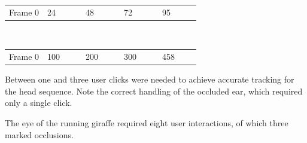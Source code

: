 \documentclass[landscape,final,fontscale=0.225,paperwidth=67.5in,paperheight=45in]{baposter}
\begin{document}
\begin{poster}
{{    }
  \begin{tabular*}{\linewidth}{*{5}{@{}p{0.2\linewidth}@{}}}
    {\hfill{}Frame 0\hfill{}} & {\hfill{}24\hfill{}} &  {\hfill{}48\hfill{}} &  {\hfill{}72\hfill{}} & {\hfill{}95\hfill{}}
  \end{tabular*}
  \\[1em]
  \begin{tabular*}{\linewidth}{*{5}{@{}p{0.2\linewidth}@{}}}
    {\hfill{}Frame 0\hfill{}}  &
    {\hfill{}100\hfill{}} &
    {\hfill{}200\hfill{}} &
    {\hfill{}300\hfill{}} &
    {\hfill{}458\hfill{}} 
  \end{tabular*}
      \begin{multicols}{2}
    Between one and three user clicks were needed to achieve accurate tracking for
      the head sequence. Note the correct handling of the occluded ear, which
      required only a single click. 

      The eye of the running giraffe required eight user interactions, of which three
      marked occlusions. 
      \end{multicols}
      \vspace{-0.6em}
}


\end{poster}
\end{document}
